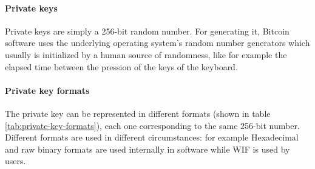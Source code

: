 \paragraph{Private keys}
Private keys are simply a 256-bit random number. For generating it, Bitcoin
software uses the underlying operating system’s random number generators which
usually is initialized by a human source of randomness, like for example the elapsed
time between the pression of the keys of the keyboard.

\paragraph{Private key formats}
The private key can be represented in different formats (shown in table
\ref{tab:private-key-formats}), each one corresponding to the same 256-bit number.
Different formats are used in different circumstances: for example Hexadecimal
and raw binary formats are used internally in software while WIF is used by users.
\begin{table}[h!]
\centering
{}
\caption{Private key representation formats \cite{antonopoulos2017mastering}}
\label{tab:private-key-formats}
\end{table}

